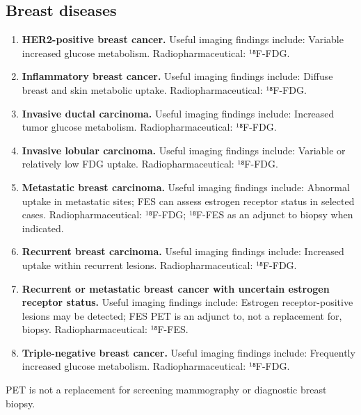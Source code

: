 \subsection{Breast diseases}
\begin{enumerate}[leftmargin=*,itemsep=0.45em,topsep=0.4em]
\item \textbf{HER2-positive breast cancer.} Useful imaging findings include: Variable increased glucose metabolism. Radiopharmaceutical: ¹⁸F-FDG.
\item \textbf{Inflammatory breast cancer.} Useful imaging findings include: Diffuse breast and skin metabolic uptake. Radiopharmaceutical: ¹⁸F-FDG.
\item \textbf{Invasive ductal carcinoma.} Useful imaging findings include: Increased tumor glucose metabolism. Radiopharmaceutical: ¹⁸F-FDG.
\item \textbf{Invasive lobular carcinoma.} Useful imaging findings include: Variable or relatively low FDG uptake. Radiopharmaceutical: ¹⁸F-FDG.
\item \textbf{Metastatic breast carcinoma.} Useful imaging findings include: Abnormal uptake in metastatic sites; FES can assess estrogen receptor status in selected cases. Radiopharmaceutical: ¹⁸F-FDG; ¹⁸F-FES as an adjunct to biopsy when indicated.
\item \textbf{Recurrent breast carcinoma.} Useful imaging findings include: Increased uptake within recurrent lesions. Radiopharmaceutical: ¹⁸F-FDG.
\item \textbf{Recurrent or metastatic breast cancer with uncertain estrogen receptor status.} Useful imaging findings include: Estrogen receptor-positive lesions may be detected; FES PET is an adjunct to, not a replacement for, biopsy. Radiopharmaceutical: ¹⁸F-FES.
\item \textbf{Triple-negative breast cancer.} Useful imaging findings include: Frequently increased glucose metabolism. Radiopharmaceutical: ¹⁸F-FDG.
\end{enumerate}
PET is not a replacement for screening mammography or diagnostic breast biopsy.

